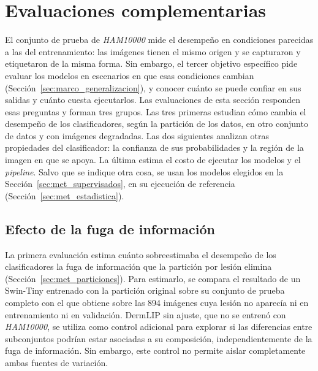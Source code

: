 
\section{Evaluaciones complementarias}
\label{sec:met_complementarios}

El conjunto de prueba de \emph{HAM10000} mide el desempeño en condiciones parecidas a las del entrenamiento: las imágenes
tienen el mismo origen y se capturaron y etiquetaron de la misma forma. Sin embargo, el tercer objetivo específico pide
evaluar los modelos en escenarios en que esas condiciones cambian (Sección~\ref{sec:marco_generalizacion}), y conocer
cuánto se puede confiar en sus salidas y cuánto cuesta ejecutarlos. Las evaluaciones de esta sección responden esas
preguntas y forman tres grupos. Las tres primeras estudian cómo cambia el desempeño de los clasificadores, según la
partición de los datos, en otro conjunto de datos y con imágenes degradadas. Las dos siguientes analizan otras
propiedades del clasificador: la confianza de sus probabilidades y la región de la imagen en que se apoya. La última
estima el costo de ejecutar los modelos y el \emph{pipeline}. Salvo que se indique otra cosa, se usan los modelos
elegidos en la Sección~\ref{sec:met_supervisados}, en su ejecución de referencia
(Sección~\ref{sec:met_estadistica}).

\subsection{Efecto de la fuga de información}
\label{sec:met_fuga}

La primera evaluación estima cuánto sobreestimaba el desempeño de los clasificadores la fuga de información que la
partición por lesión elimina (Sección~\ref{sec:met_particiones}). Para estimarlo, se compara el resultado de un
Swin-Tiny entrenado con la partición original sobre su conjunto de prueba completo con el que obtiene sobre las 894
imágenes cuya lesión no aparecía ni en entrenamiento ni en validación. DermLIP sin ajuste, que no se entrenó con \emph{HAM10000}, se utiliza como control adicional para explorar si las diferencias entre subconjuntos podrían estar asociadas a su composición, independientemente de la fuga de información. Sin embargo, este control no permite aislar completamente ambas fuentes de variación.

